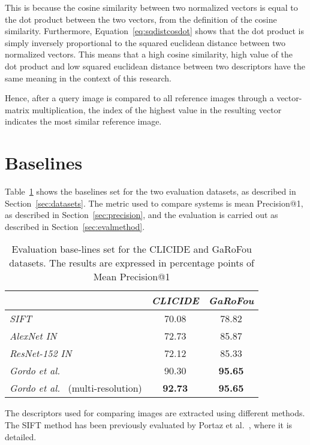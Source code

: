 This is because the cosine similarity between two normalized vectors is
equal to the dot product between the two vectors, from the definition
of the cosine similarity. Furthermore, Equation~\ref{eq:sqdistcosdot} shows
that the dot product is simply inversely proportional to the squared
euclidean distance between two normalized vectors.
This means that a high cosine similarity, high value of the dot product
and low squared euclidean distance between two descriptors have the
same meaning in the context of this research.

Hence, after a query image is compared to all reference images through
a vector-matrix multiplication, the index of the highest value in the
resulting vector indicates the most similar reference image.

\section{Baselines}\label{sec:baselines}
Table~\ref{tab:baselines} shows the baselines set for the two evaluation
datasets, as described in Section~\ref{sec:datasets}. The metric used
to compare systems is mean Precision@1, as described in
Section~\ref{sec:precision}, and the evaluation is carried out as
described in Section~\ref{sec:evalmethod}.

\begin{table}
\begin{tabular}{|l|c|c|}
\hline & \emph{CLICIDE} & \emph{GaRoFou}\\
\hline \emph{SIFT} & 70.08 & 78.82\\
\hline \emph{AlexNet IN} & 72.73 & 85.87\\
\hline \emph{ResNet-152 IN} & 72.12 & 85.33\\
\hline \emph{Gordo et al.}~\cite{gordo_deep_2016} & 90.30 & \textbf{95.65}\\
\hline \emph{Gordo et al.}~\cite{gordo_deep_2016} (multi-resolution)
& \textbf{92.73} & \textbf{95.65}\\
\hline
\end{tabular}
\caption{Evaluation base-lines set for the CLICIDE and GaRoFou datasets.
The results are expressed in percentage points of
Mean Precision@1\label{tab:baselines}}
\end{table}

The descriptors used for comparing images are extracted using different
methods.
The SIFT method has been previously evaluated by
Portaz et al.~\cite{portaz_construction_nodate}, where it is detailed.


